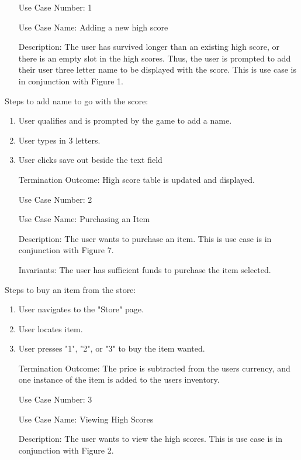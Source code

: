\documentclass[10pt,conference,onecolumn,compsoc]{IEEEtran}
\begin{document}
\begin{itemize}
\item[Use Case Number:] 1
\item[Use Case Name:] Adding a new high score
\item[Description:] The user has survived longer than an existing high score, or there is an empty slot in the high scores. Thus, the user is prompted to add their user three letter name to be displayed with the score. This is use case is in conjunction with Figure 1.\end{itemize}

Steps to add name to go with the score:

\begin{enumerate}
\item User qualifies and is prompted by the game to add a name.
\item User types in 3 letters.
\item User clicks save out beside the text field
\item[Termination Outcome:] High score table is updated and displayed.\\
\end{enumerate}

\begin{itemize}
\item[Use Case Number:] 2
\item[Use Case Name:] Purchasing an Item
\item[Description:] The user wants to purchase an item. This is use case is in conjunction with Figure 7.
\item[Invariants:] The user has sufficient funds to purchase the item selected.
\end{itemize}

Steps to buy an item from the store:

\begin{enumerate}
\item User navigates to the "Store" page.
\item User locates item.
\item User presses "1", "2", or "3" to buy the item wanted.
\item[Termination Outcome:] The price is subtracted from the users currency, and one instance of the 
item is added to the users inventory.\\
\end{enumerate}

\begin{itemize}
\item[Use Case Number:] 3
\item[Use Case Name:] Viewing High Scores
\item[Description:] The user wants to view the high scores. This is use case is in conjunction with Figure 2.
\end{itemize}
\end{document}
